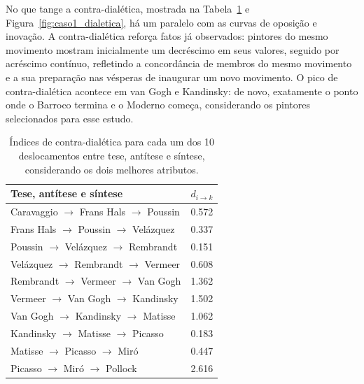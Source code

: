 No que tange a contra-dialética, mostrada na Tabela~\ref{tab:dialetica1} e
Figura~\ref{fig:caso1_dialetica}, há um paralelo com as curvas de
oposição e inovação. A contra-dialética reforça fatos já observados: pintores do
mesmo movimento mostram inicialmente um decréscimo em seus valores, seguido por
acréscimo contínuo, refletindo a concordância de membros do mesmo movimento e a
sua preparação nas vésperas de inaugurar um novo movimento. O pico de
contra-dialética acontece em van Gogh e Kandinsky: de novo, exatamente o ponto
onde o Barroco termina e o Moderno começa, considerando os pintores selecionados
para esse estudo.

\begin{table}[ht]
  \begin{center}
  \caption{\label{tab:dialetica1} Índices de contra-dialética para cada um dos
    10 deslocamentos entre tese, antítese e síntese, considerando os dois
    melhores atributos.}
\begin{tabular}{@{}ll}
  
    \hline \hline
    Tese, antítese e síntese & $d_{i \rightarrow k}$ \\
    \hline
    Caravaggio $\to$ Frans Hals $\to$ Poussin   & 0.572 \\
    Frans Hals $\to$ Poussin $\to$ Vel\'{a}zquez & 0.337 \\
    Poussin $\to$ Vel\'{a}zquez $\to$ Rembrandt  & 0.151 \\
    Vel\'{a}zquez $\to$ Rembrandt $\to$ Vermeer  & 0.608 \\
    Rembrandt $\to$ Vermeer $\to$ Van Gogh      & 1.362 \\
    Vermeer $\to$ Van Gogh $\to$ Kandinsky      & 1.502 \\
    Van Gogh $\to$ Kandinsky $\to$ Matisse      & 1.062 \\
    Kandinsky $\to$ Matisse $\to$ Picasso       & 0.183 \\
    Matisse $\to$ Picasso $\to$ Mir\'{o}         & 0.447 \\
    Picasso $\to$ Mir\'{o} $\to$ Pollock         & 2.616 \\
    \hline \hline
  \end{tabular}
\end{center}
\end{table}


